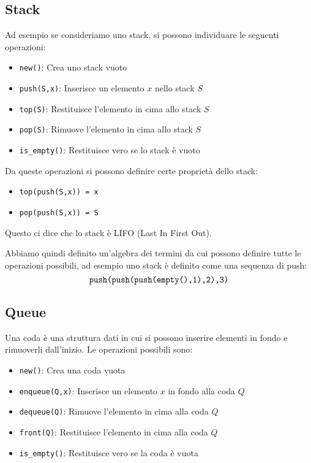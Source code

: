 \documentclass[a4paper]{article}
\begin{document}
\subsection{Stack}
Ad esempio se consideriamo uno stack, si possono individuare le seguenti operazioni:
\begin{itemize}
  \item \texttt{new()}: Crea uno stack vuoto
  \item \texttt{push(S,x)}: Inserisce un elemento \( x \) nello stack \( S \) 
  \item \texttt{top(S)}: Restituisce l'elemento in cima allo stack \( S \) 
  \item \texttt{pop(S)}: Rimuove l'elemento in cima allo stack \( S \) 
  \item \texttt{is\_empty()}: Restituisce vero se lo stack è vuoto
\end{itemize}
Da queste operazioni si possono definire certe proprietà dello stack:
\begin{itemize}
  \item \texttt{top(push(S,x)) = x}
  \item \texttt{pop(push(S,x)) = S}
\end{itemize}
Questo ci dice che lo stack è LIFO (Last In First Out). 

\vspace{1em}
\noindent
Abbiamo quindi definito
un'algebra dei termini da cui possono definire tutte le operazioni possibili,
ad esempio uno stack è definito come una sequenza di push:
\[
  \text{\texttt{push(push(push(empty(),1),2),3)}}
\] 

\subsection{Queue}
Una coda è una struttura dati in cui si possono inserire elementi in fondo e
rimuoverli dall'inizio. Le operazioni possibili sono:
\begin{itemize}
  \item \texttt{new()}: Crea una coda vuota
  \item \texttt{enqueue(Q,x)}: Inserisce un elemento \( x \) in fondo alla coda \( Q \) 
  \item \texttt{dequeue(Q)}: Rimuove l'elemento in cima alla coda \( Q \) 
  \item \texttt{front(Q)}: Restituisce l'elemento in cima alla coda \( Q \) 
  \item \texttt{is\_empty()}: Restituisce vero se la coda è vuota
\end{itemize}
\end{document}
